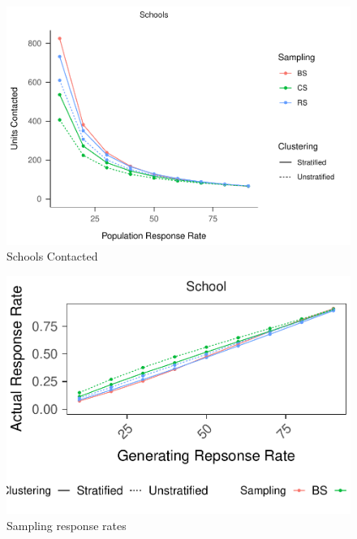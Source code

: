 \documentclass[man,floatsintext]{apa6}
\begin{document}
\begin{figure}
\centering
\includegraphics{Results_files/figure-latex/unnamed-chunk-11-1.pdf}
\caption{\label{fig:unnamed-chunk-11}Schools Contacted}
\end{figure}

\begin{figure}
\centering
\includegraphics{Results_files/figure-latex/unnamed-chunk-12-1.pdf}
\caption{\label{fig:unnamed-chunk-12}Sampling response rates}
\end{figure}
\end{document}
